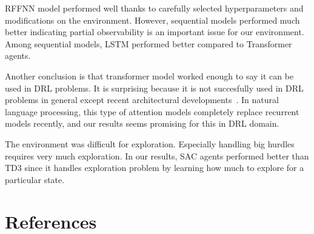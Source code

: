 \documentclass[a4paper, 12pt]{article} %
\begin{document}
RFFNN model performed well thanks to carefully selected hyperparameters and modifications on the environment. 
However, sequential models performed much better indicating partial observability is an important issue for our environment. 
Among sequential models, LSTM performed better compared to Transformer agents. 

Another conclusion is that transformer model worked enough to say it can be used in DRL problems. 
It is surprising because it is not succesfully used in DRL problems in general except recent architectural developments~\cite{parisotto_stabilizing_2019}. 
In natural language processing, this type of attention models completely replace recurrent models recently, and our results seems promising for this in DRL domain. 

The environment was difficult for exploration. 
Especially handling big hurdles requires very much exploration.
In our results, SAC agents performed better than TD3 since it handles exploration problem by learning how much to explore for a particular state. 

\section{References}




%

%
% 

%
%
\end{document}
